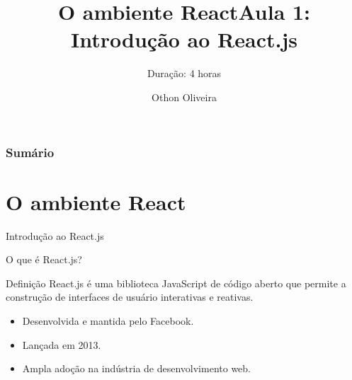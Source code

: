 \documentclass[13pt, xcolor={dvipsnames,svgnames}, portuguese]{beamer}
\author{Othon Oliveira}
\title{O ambiente React}
\institute{SENAC - PROA}
\date{}
\begin{document}
\begin{frame}
\titlepage
\end{frame}

\newcommand{\capa}{
    \begin{tikzpicture}[remember picture,overlay]
        \node at (current page.south west)
            {\begin{tikzpicture}[remember picture, overlay]
                \fill[shading=radial,top color=orange,bottom color=orange,middle color=yellow] (0,0) rectangle (\paperwidth,\paperheight);
            \end{tikzpicture}
          };
    \end{tikzpicture}
}

\begin{frame}\frametitle{Sumário}
\tableofcontents
\end{frame}


\section{O ambiente React}

\begin{frame}{Introdução ao React.js}
  \title{Aula 1: Introdução ao React.js}
  \subtitle{Duração: 4 horas}
  \maketitle
\end{frame}

\begin{frame}{O que é React.js?}
  \begin{block}{Definição}
    React.js é uma biblioteca JavaScript de código aberto que permite a construção de interfaces de usuário interativas e reativas.
  \end{block}

  \begin{itemize}
    \item Desenvolvida e mantida pelo Facebook.
    \item Lançada em 2013.
    \item Ampla adoção na indústria de desenvolvimento web.
  \end{itemize}
\end{frame}
\end{document}
